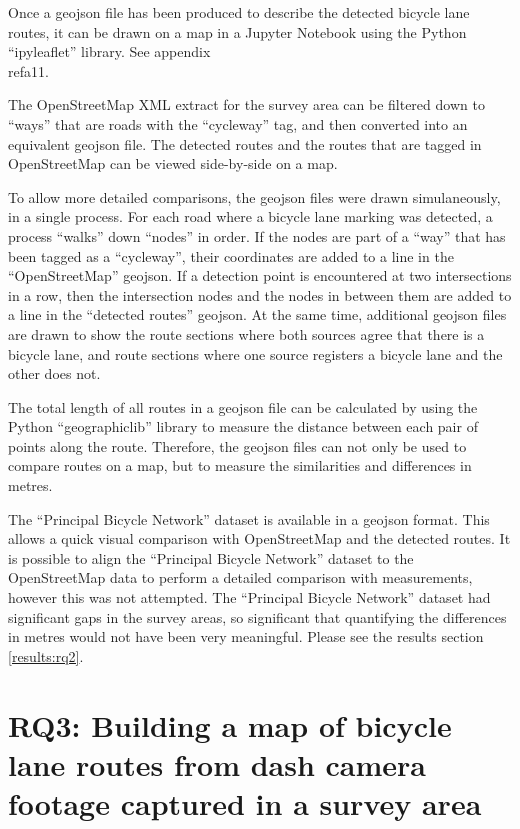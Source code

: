 \documentclass[11pt,twoside]{report}
\begin{document}
Once a geojson file has been produced to describe the detected bicycle lane routes, it can be drawn on a map in a Jupyter Notebook using the Python ``ipyleaflet'' library.  See appendix \\ref{a11}.

The OpenStreetMap XML extract for the survey area can be filtered down to ``ways'' that are roads with the ``cycleway'' tag, and then converted into an equivalent geojson file.  The detected routes and the routes that are tagged in OpenStreetMap can be viewed side-by-side on a map.

To allow more detailed comparisons, the geojson files were drawn simulaneously, in a single process.  For each road where a bicycle lane marking was detected, a process ``walks'' down ``nodes'' in order.  If the nodes are part of a ``way'' that has been tagged as a ``cycleway'', their coordinates are added to a line in the ``OpenStreetMap'' geojson.  If a detection point is encountered at two intersections in a row, then the intersection nodes and the nodes in between them are added to a line in the ``detected routes'' geojson.  At the same time, additional geojson files are drawn to show the route sections where both sources agree that there is a bicycle lane, and route sections where one source registers a bicycle lane and the other does not.

The total length of all routes in a geojson file can be calculated by using the Python ``geographiclib'' library to measure the distance between each pair of points along the route.  Therefore, the geojson files can not only be used to compare routes on a map, but to measure the similarities and differences in metres.

The ``Principal Bicycle Network'' dataset is available in a geojson format.  This allows a quick visual comparison with OpenStreetMap and the detected routes.  It is possible to align the ``Principal Bicycle Network'' dataset to the OpenStreetMap data to perform a detailed comparison with measurements, however this was not attempted.  The ``Principal Bicycle Network'' dataset had significant gaps in the survey areas, so significant that quantifying the differences in metres would not have been very meaningful.  Please see the results section \ref{results:rq2}.



\section{RQ3: Building a map of bicycle lane routes from dash camera footage captured in a survey area}
\label{s:rq3}
\end{document}
